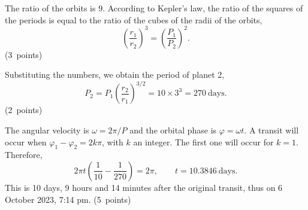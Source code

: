The ratio of the orbits is 9. According to Kepler's law, the ratio of the squares of the periods is equal
to the ratio of the cubes of the radii of the orbits,
\[
\left(\frac{r_1}{r_2}\right)^3=\left(\frac{P_1}{P_2}\right)^2.
\]
\hfill\mbox{(3 points)}

Substituting the numbers, we obtain the period of planet 2,
\[
P_2=P_1\left(\frac{r_2}{r_1}\right)^{3/2}=10\times3^3=270\ \mathrm{days}.
\]
\hfill\mbox{(2 points)}

The angular velocity is $\omega=2\pi/P$ and the orbital phase is $\varphi=\omega t$.
A transit will occur when $\varphi_1-\varphi_2=2k\pi$, with $k$ an integer. The first one will occur for $k=1$.
Therefore,
\[
2\pi t\left(\frac{1}{10}-\frac{1}{270}\right)=2\pi,
\qquad t=10.3846\ \mathrm{days}.
\]
This is 10 days, 9 hours and 14 minutes after the original transit, thus on 6 October 2023, 7:14 pm.
\hfill\mbox{(5 points)}
